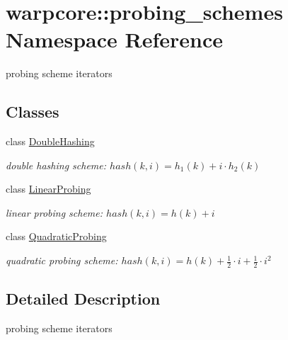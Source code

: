 \hypertarget{namespacewarpcore_1_1probing__schemes}{}\section{warpcore\+:\+:probing\+\_\+schemes Namespace Reference}
\label{namespacewarpcore_1_1probing__schemes}


probing scheme iterators  


\subsection*{Classes}
\begin{DoxyCompactItemize}
\item 
class \hyperlink{classwarpcore_1_1probing__schemes_1_1DoubleHashing}{Double\+Hashing}
\begin{DoxyCompactList}\small\item\em double hashing scheme\+: $hash(k,i) = h_1(k)+i\cdot h_2(k)$ \end{DoxyCompactList}\item 
class \hyperlink{classwarpcore_1_1probing__schemes_1_1LinearProbing}{Linear\+Probing}
\begin{DoxyCompactList}\small\item\em linear probing scheme\+: $hash(k,i) = h(k)+i$ \end{DoxyCompactList}\item 
class \hyperlink{classwarpcore_1_1probing__schemes_1_1QuadraticProbing}{Quadratic\+Probing}
\begin{DoxyCompactList}\small\item\em quadratic probing scheme\+: $hash(k,i) = h(k)+\frac{1}{2}\cdot i+\frac{1}{2}\cdot i^2$ \end{DoxyCompactList}\end{DoxyCompactItemize}


\subsection{Detailed Description}
probing scheme iterators 